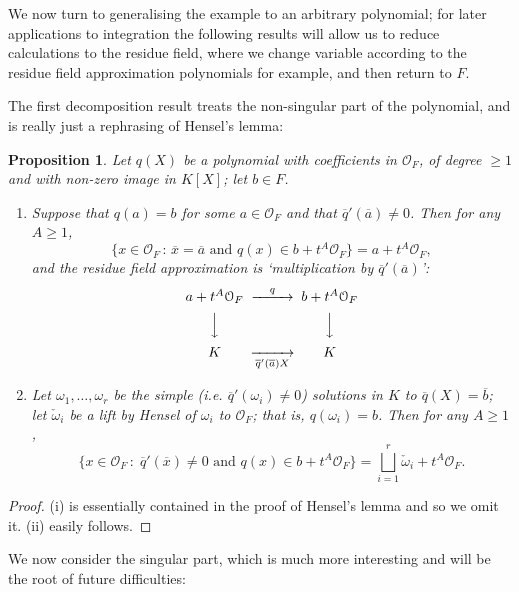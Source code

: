 \documentclass{lmsMODIFIED}
\newtheorem{proposition}[theorem]{Proposition}
\newcommand{\roi}{\mathcal{O}}
\newcommand{\res}[1]{\overline{#1}}
\newcommand{\w}{\omega}
\begin{document}
We now turn to generalising the example to an arbitrary polynomial; for later applications to integration the following results will allow us to reduce calculations to the residue field, where we change variable according to the residue field approximation polynomials for example, and then return to $F$.

The first decomposition result treats the non-singular part of the polynomial, and is really just a rephrasing of Hensel's lemma:

\begin{proposition}\label{proposition_non_singular_decomposition}
Let $q(X)$ be a polynomial with coefficients in $\roi_{F}$, of degree $\ge1$ and with non-zero image in $ K [X]$; let $b\in F$. 
\begin{enumerate}
\item Suppose that $q(a)=b$ for some $a\in\roi_{F}$ and that $\res{q}'(\res{a})\neq 0$. Then for any $A\ge 1$, \[\{x\in\roi_{F}\,:\,\res{x}=\res{a}\mbox{ and }q(x)\in b+t^A\roi_{F}\}=a+t^A\roi_{F},\] and the residue field approximation is `multiplication by $\res{q}'(\res{a})$':
\[\begin{CD}
a+t^A\roi_{F} @>q>> b+t^A\roi_{F} \\
@VVV  @VVV  \\
 K  @>>\res{q}'(\res{a})X>  K \\
\end{CD}\]
\item Let $\w_1,\dots,\w_r$ be the simple (i.e. $\res{q}'(\w_i)\neq 0$) solutions in $ K $ to $\res{q}(X)=\res{b}$; let $\check{\w}_i$ be a lift by Hensel of $\w_i$ to $\roi_{F}$; that is, $q(\w_i)=b$. Then for any $A\ge 1$, \[\{x\in\roi_{F}\,:\;\res{q}'(\res{x})\neq0\mbox{ and }q(x)\in b+t^A\roi_{F}\} = \bigsqcup_{i=1}^r\check{\w}_i+t^A\roi_{F}.\]
\end{enumerate}
\end{proposition}
\begin{proof}
(i) is essentially contained in the proof of Hensel's lemma and so we omit it. (ii) easily follows.
\end{proof}

We now consider the singular part, which is much more interesting and will be the root of future difficulties:
\end{document}
